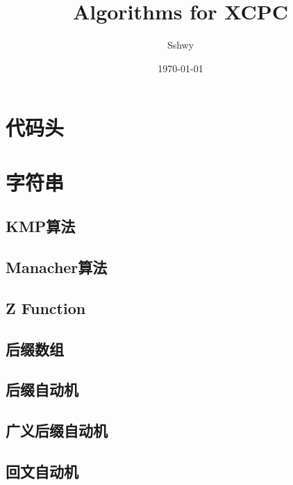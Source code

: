 \documentclass[a4paper,12pt]{article}
\begin{document}
\title{Algorithms for XCPC}
\author{Sshwy}
\date{\today}
\maketitle

\newpage

\tableofcontents
\newpage
{}

\section{代码头}



\section{字符串}

\subsection{KMP算法}

\subsection{Manacher算法}

\subsection{Z Function}

\subsection{后缀数组}

\subsection{后缀自动机}

\subsection{广义后缀自动机}

\subsection{回文自动机}

\end{document}
